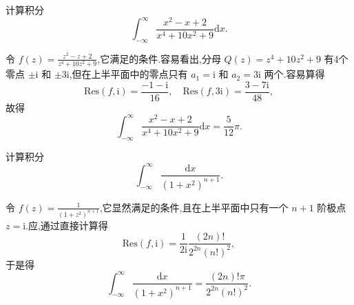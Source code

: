 \documentclass[../../main.tex]{subfiles}%
\begin{document}
\begin{example}
计算积分
\[
\int_{-\infty}^{\infty} \frac{x^2 - x + 2}{x^4 + 10x^2 + 9} \mathrm{d}x.
\]
\end{example}
\begin{solution}
令 \( f(z) = \frac{z^2 - z + 2}{z^4 + 10z^2 + 9} \),它满足的条件.容易看出,分母 \( Q(z) = z^4 + 10z^2 + 9 \) 有4个零点 \( \pm \mathrm{i} \) 和 \( \pm 3\mathrm{i} \),但在上半平面中的零点只有 \( a_1 = \mathrm{i} \) 和 \( a_2 = 3\mathrm{i} \) 两个.容易算得
\[
\mathrm{Res}(f, \mathrm{i}) = \frac{-1 - \mathrm{i}}{16},
\quad
\mathrm{Res}(f, 3\mathrm{i}) = \frac{3 - 7\mathrm{i}}{48},
\]
故得
\[
\int_{-\infty}^{\infty} \frac{x^2 - x + 2}{x^4 + 10x^2 + 9} \mathrm{d}x = \frac{5}{12}\pi.
\]

\end{solution}

\begin{example}
计算积分
\[
\int_{-\infty}^{\infty} \frac{\mathrm{d}x}{(1 + x^2)^{n + 1}}.
\]
\end{example}
\begin{solution}
令 \( f(z) = \frac{1}{(1 + z^2)^{n + 1}} \),它显然满足的条件,且在上半平面中只有一个 \( n + 1 \) 阶极点 \( z = \mathrm{i} \).应,通过直接计算得
\[
\mathrm{Res}(f, \mathrm{i}) = \frac{1}{2\mathrm{i}} \frac{(2n)!}{2^{2n} (n!)^2},
\]
于是得
\[
\int_{-\infty}^{\infty} \frac{\mathrm{d}x}{(1 + x^2)^{n + 1}} = \frac{(2n)! \pi}{2^{2n} (n!)^2}.
\]

\end{solution}
\end{document}
